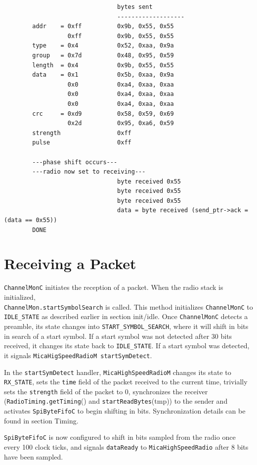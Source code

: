 \documentclass[11pt]{article}
\begin{document}
\begin{verbatim}
                                bytes sent
                                -------------------
        addr    = 0xff          0x9b, 0x55, 0x55
                  0xff          0x9b, 0x55, 0x55
        type    = 0x4           0x52, 0xaa, 0x9a
        group   = 0x7d          0x48, 0x95, 0x59
        length  = 0x4           0x9b, 0x55, 0x55
        data    = 0x1           0x5b, 0xaa, 0x9a
                  0x0           0xa4, 0xaa, 0xaa
                  0x0           0xa4, 0xaa, 0xaa
                  0x0           0xa4, 0xaa, 0xaa
        crc     = 0xd9          0x58, 0x59, 0x69
                  0x2d          0x95, 0xa6, 0x59
        strength                0xff
        pulse                   0xff

        ---phase shift occurs---
        ---radio now set to receiving---
                                byte received 0x55
                                byte received 0x55
                                byte received 0x55
                                data = byte received (send_ptr->ack = (data == 0x55))
        DONE
\end{verbatim}


\section*{Receiving a Packet}
{\tt ChannelMonC} initiates the reception of a packet. When the radio stack
is initialized, \\
{\tt ChannelMon.startSymbolSearch} is called. This method
initializes {\tt ChannelMonC} to {\tt IDLE\_STATE} as described earlier in section
init/idle. Once {\tt ChannelMonC} detects a preamble, its state changes into
{\tt START\_SYMBOL\_SEARCH}, where it will shift in bits in search of a start
symbol. If a start symbol was not detected after 30 bits received, it
changes its state back to {\tt IDLE\_STATE}. If a start symbol was detected,
it signals {\tt MicaHigSpeedRadioM startSymDetect}.

In the {\tt startSymDetect} handler, {\tt MicaHighSpeedRadioM} changes its state
to {\tt RX\_STATE}, sets the {\tt time} field of the packet received to the current
time, trivially sets the {\tt strength} field of the packet to 0,
synchronizes the receiver ({\tt RadioTiming.getTiming}() and {\tt startReadBytes}(tmp)) to the sender and activates {\tt SpiByteFifoC} to
begin shifting in bits. Synchronization details can be found in
section Timing. 

{\tt SpiByteFifoC} is now configured to shift in bits sampled from the radio
once every 100 clock ticks, and signals {\tt dataReady} to
{\tt MicaHighSpeedRadio} after 8 bits have been sampled.
\end{document}
